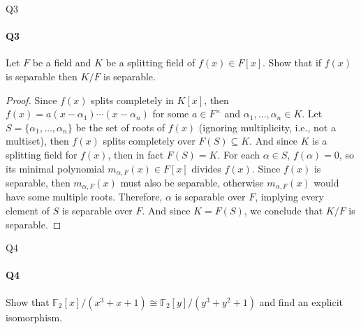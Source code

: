\documentclass[12pt]{article}
\newenvironment{fullbox}{\begin{lrbox}{\savefullbox}\begin{minipage}{\dimexpr\textwidth-2\fboxsep\relax}}{\end{minipage}\end{lrbox}\begin{center}\framebox[\textwidth]{\usebox{\savefullbox}}\end{center}}
\newenvironment{pbox}[1][]{\begin{fullbox}\ifx#1\empty\else\paragraph{#1}\fi}{\end{fullbox}}
\theoremstyle{definition}
\newcommand{\isom}{\cong}
\newcommand{\F}{\mathbb{F}}
\begin{document}
\newpage
\begin{pbox}[Q3]
    Let $F$ be a field and $K$ be a splitting field of $f(x) \in F[x]$. Show that if $f(x)$ is separable then $K/F$ is separable.
\end{pbox}

\begin{proof}
    Since $f(x)$ splits completely in $K[x]$, then $f(x) = a(x - \alpha_1) \cdots (x - \alpha_n)$ for some $a \in F^\times$ and $\alpha_1, \dots, \alpha_n \in K$. Let $S = \{\alpha_1, \dots, \alpha_n\}$ be the set of roots of $f(x)$ (ignoring multiplicity, i.e., not a multiset), then $f(x)$ splits completely over $F(S) \subseteq K$. And since $K$ is a splitting field for $f(x)$, then in fact $F(S) = K$. For each $\alpha \in S$, $f(\alpha) = 0$, so its minimal polynomial $m_{\alpha, F}(x) \in F[x]$ divides $f(x)$. Since $f(x)$ is separable, then $m_{\alpha, F}(x)$ must also be separable, otherwise $m_{\alpha, F}(x)$ would have some multiple roots. Therefore, $\alpha$ is separable over $F$, implying every element of $S$ is separable over $F$. And since $K = F(S)$, we conclude that $K/F$ is separable.

\end{proof}



\newpage
\begin{pbox}[Q4]
    Show that $\F_2[x]/(x^3 + x + 1) \isom \F_2[y]/(y^3 + y^2 + 1)$ and find an explicit isomorphism.
\end{pbox}
\end{document}
